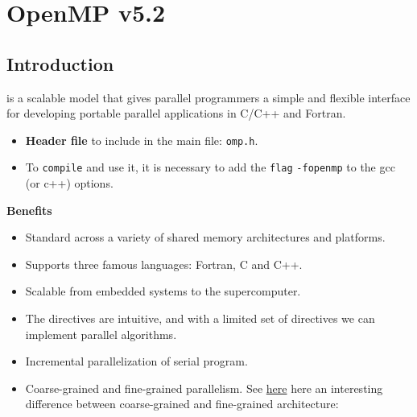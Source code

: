 \section{OpenMP v5.2}

\subsection{Introduction}

 is a scalable model that gives parallel programmers a simple and flexible interface for developing portable parallel applications in C/C++ and Fortran.
\begin{itemize}
    \item \textbf{Header file} to include in the main file: \texttt{omp.h}.
    \item To \texttt{compile} and use it, it is necessary to add the \texttt{flag} \texttt{-fopenmp} to the gcc (or c++) options.
\end{itemize}
\begin{flushleft}
    \textcolor{Green3}{ \textbf{Benefits}}
\end{flushleft}
\begin{itemize}
    \item Standard across a variety of shared memory architectures and platforms.
    \item Supports three famous languages: Fortran, C and C++.
    \item Scalable from embedded systems to the supercomputer.
    \item The directives are intuitive, and with a limited set of directives we can implement parallel algorithms.
    \item Incremental parallelization of serial program.
    \item Coarse-grained and fine-grained parallelism. See \href{https://www.geeksforgeeks.org/difference-between-fine-grained-and-coarse-grained-simd-architecture/}{here} here an interesting difference between coarse-grained and fine-grained architecture:
    \begin{center}
    \end{center}
\end{itemize}

